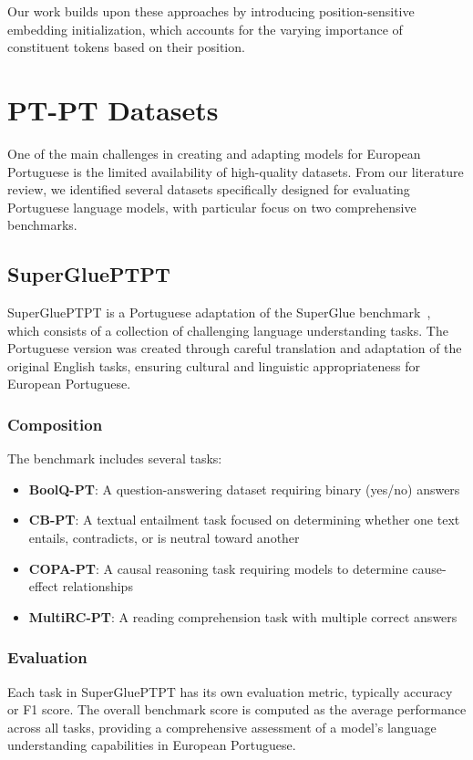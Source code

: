 Our work builds upon these approaches by introducing position-sensitive embedding initialization, which accounts for the varying importance of constituent tokens based on their position.

\section{PT-PT Datasets}\label{Section3.3}
One of the main challenges in creating and adapting models for European Portuguese is the limited availability of high-quality datasets. From our literature review, we identified several datasets specifically designed for evaluating Portuguese language models, with particular focus on two comprehensive benchmarks.

\subsection{SuperGluePTPT}\label{Section3.3.1}
SuperGluePTPT is a Portuguese adaptation of the SuperGlue benchmark~\cite{wang2019superglue}, which consists of a collection of challenging language understanding tasks. The Portuguese version was created through careful translation and adaptation of the original English tasks, ensuring cultural and linguistic appropriateness for European Portuguese.

\subsubsection{Composition}
The benchmark includes several tasks:
\begin{itemize}
    \item \textbf{BoolQ-PT}: A question-answering dataset requiring binary (yes/no) answers
    \item \textbf{CB-PT}: A textual entailment task focused on determining whether one text entails, contradicts, or is neutral toward another
    \item \textbf{COPA-PT}: A causal reasoning task requiring models to determine cause-effect relationships
    \item \textbf{MultiRC-PT}: A reading comprehension task with multiple correct answers
\end{itemize}

\subsubsection{Evaluation}
Each task in SuperGluePTPT has its own evaluation metric, typically accuracy or F1 score. The overall benchmark score is computed as the average performance across all tasks, providing a comprehensive assessment of a model's language understanding capabilities in European Portuguese.

